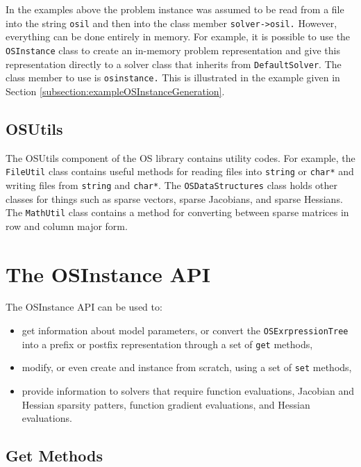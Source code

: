\documentclass[11pt]{article}
\renewcommand{\_}{{\char"5F}}
\renewcommand{\{}{{\char"7B}}
\renewcommand{\}}{{\char"7D}}
\renewcommand{\^}{{\char"0D}}
\renewcommand{\'}{{\char"0D}}
\begin{document}
In the examples above the problem instance was assumed to be read from a file into the string {\tt osil} and then into the class member {\tt solver->osil.} However, everything can be done entirely in memory. For example, it is possible to use the {\tt OSInstance} class to create an in-memory problem representation and give this representation directly to a solver class that inherits from {\tt DefaultSolver}. The class member to use is {\tt osinstance.} This is illustrated in the example given in Section \ref{subsection:exampleOSInstanceGeneration}.


\subsection{OSUtils}

The OSUtils component of the OS library contains utility codes. For example, the {\tt FileUtil} class contains useful methods for reading files into {\tt string} or {\tt char*} and writing files from {\tt string} and {\tt char*}.  The {\tt OSDataStructures} class holds other classes for things such as sparse vectors, sparse Jacobians, and sparse Hessians. The {\tt MathUtil} class contains a method for converting between sparse matrices in row and column major form.


\section{The  OSInstance API}\label{section:osinstanceAPI}

The OSInstance API can be used to:

\begin{itemize}

\item  get information about model parameters, or convert the {\tt OSExrpressionTree} into a prefix or postfix representation through a set of {\tt get} methods,

\item modify, or even create and instance from scratch, using a set of {\tt set} methods,

\item provide information to solvers that require function evaluations, Jacobian and Hessian sparsity patters,  function gradient evaluations, and Hessian evaluations. 

\end{itemize}



\subsection{Get Methods}
\end{document}
